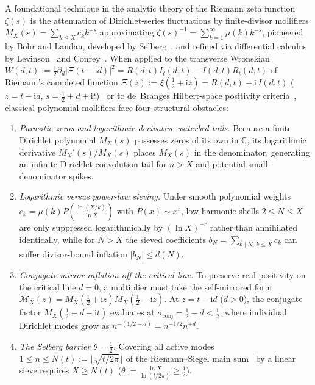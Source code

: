 \documentclass[11pt,reqno]{amsart}
\theoremstyle{definition}
\theoremstyle{remark}
\numberwithin{equation}{section}
\newcommand{\C}{\mathbb{C}}
\newcommand{\ii}{\mathrm{i}}
\begin{document}
A foundational technique in the analytic theory of the Riemann zeta function $\zeta(s)$ is the attenuation of Dirichlet-series fluctuations by finite-divisor mollifiers $M_X(s) = \sum_{k \le X} c_k k^{-s}$ approximating $\zeta(s)^{-1} = \sum_{k=1}^{\infty} \mu(k)k^{-s}$, pioneered by Bohr and Landau, developed by Selberg~\cite{selberg1942}, and refined via differential calculus by Levinson~\cite{levinson1974} and Conrey~\cite{conrey1989}. When applied to the transverse Wronskian $W(d,t) := \frac{1}{2}\partial_d|\Xi(t - \ii d)|^2 = R(d,t)I_t(d,t) - I(d,t)R_t(d,t)$ of Riemann's completed function $\Xi(z) := \xi(\frac{1}{2}+\ii z) = R(d,t) + \ii\,I(d,t)$ ($z = t - \ii d$, $s = \frac{1}{2} + d + \ii t$)~\cite{riemann1859,speiser1934,hinkkanen1997,lagarias1999} or to de~Branges Hilbert-space positivity criteria~\cite{conreyli2000,csordas1986}, classical polynomial mollifiers face four structural obstacles:
\begin{enumerate}[label=\textup{(\arabic*)},leftmargin=2.2em]
\item \textit{Parasitic zeros and logarithmic-derivative waterbed tails.} Because a finite Dirichlet polynomial $M_X(s)$ possesses zeros of its own in $\C$, its logarithmic derivative $M_X'(s)/M_X(s)$ places $M_X(s)$ in the denominator, generating an infinite Dirichlet convolution tail for $n > X$ and potential small-denominator spikes.
\item \textit{Logarithmic versus power-law sieving.} Under smooth polynomial weights $c_k = \mu(k)P(\frac{\ln(X/k)}{\ln X})$ with $P(x) \sim x^r$, low harmonic shells $2 \le N \le X$ are only suppressed logarithmically by $(\ln X)^{-r}$ rather than annihilated identically, while for $N > X$ the sieved coefficients $b_N = \sum_{k \mid N,\, k \le X} c_k$ can suffer divisor-bound inflation $|b_N| \le d(N)$.
\item \textit{Conjugate mirror inflation off the critical line.} To preserve real positivity on the critical line $d = 0$, a multiplier must take the self-mirrored form $\mathcal{M}_X(z) = M_X(\frac{1}{2}+\ii z)M_X(\frac{1}{2}-\ii z)$. At $z = t - \ii d$ ($d > 0$), the conjugate factor $M_X(\frac{1}{2}-d-\ii t)$ evaluates at $\sigma_{\mathrm{conj}} = \frac{1}{2} - d < \frac{1}{2}$, where individual Dirichlet modes grow as $n^{-(1/2-d)} = n^{-1/2}n^{+d}$.
\item \textit{The Selberg barrier $\theta = \frac{1}{2}$.} Covering all active modes $1 \le n \le N(t) := \lfloor\sqrt{t/2\pi}\rfloor$ of the Riemann--Siegel main sum~\cite{siegel1932,gabcke1979} by a linear sieve requires $X \ge N(t)$ ($\theta := \frac{\ln X}{\ln(t/2\pi)} \ge \frac{1}{2}$).
\end{enumerate}
\end{document}
